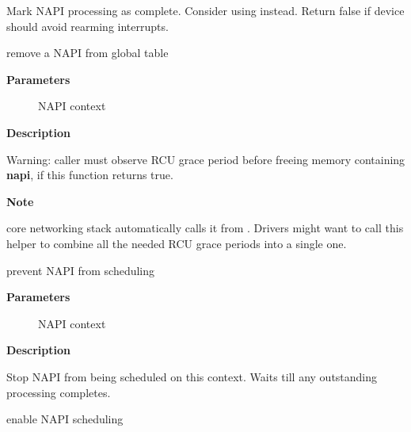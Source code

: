 \documentclass[a4paper,8pt,english]{sphinxmanual}
\begin{document}
Mark NAPI processing as complete.
Consider using  instead.
Return false if device should avoid rearming interrupts.

\begin{fulllineitems}
\label{networking/kapi:c.napi_hash_del}
remove a NAPI from global table

\end{fulllineitems}


\textbf{Parameters}
\begin{description}
\item[{}] \leavevmode
NAPI context

\end{description}

\textbf{Description}

Warning: caller must observe RCU grace period
before freeing memory containing \textbf{napi}, if
this function returns true.

\textbf{Note}

core networking stack automatically calls it
from {\hyperref[networking/kapi:c.netif_napi_del]{\emph{}}}.
Drivers might want to call this helper to combine all
the needed RCU grace periods into a single one.

\begin{fulllineitems}
\label{networking/kapi:c.napi_disable}
prevent NAPI from scheduling

\end{fulllineitems}


\textbf{Parameters}
\begin{description}
\item[{}] \leavevmode
NAPI context

\end{description}

\textbf{Description}

Stop NAPI from being scheduled on this context.
Waits till any outstanding processing completes.

\begin{fulllineitems}
\label{networking/kapi:c.napi_enable}
enable NAPI scheduling

\end{fulllineitems}
\end{document}
